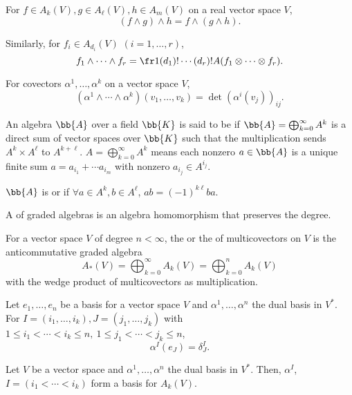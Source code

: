 For $f \in A_k(V), g \in A_\ell(V), h \in A_m(V)$ on a real vector space $V$,
\[
(f \wedge g) \wedge h = f \wedge ( g \wedge h).
\]

Similarly, for $f_i \in A_{d_i}(V)$ $(i = 1, \dotsc, r)$,
\[
f_1 \wedge \dotsb \wedge f_r = \fr1{(d_1)!\dotsm (d_r)!} A(f_1 \otimes \dotsm \otimes f_r).
\]

For covectors $\alpha^1, \dotsc , \alpha^k$ on a vector space $V$,
\[
(\alpha^1\wedge \dotsm \wedge \alpha^k)(v_1,\dotsc, v_k) = \det (\alpha^i (v_j))_{ij}.
\]

An algebra $\bb{A}$ over a field $\bb{K}$ is said to be  if $\bb{A} = \bigoplus_{k = 0}^\infty A^k$ is a direct sum of vector spaces over $\bb{K}$ such that the multiplication sends $A^k \times A^\ell$ to $A^{k+\ell}$. $A = \bigoplus_{k = 0}^\infty A^k$ means each nonzero $a \in \bb{A}$ is a unique finite sum $a = a_{i_1} + \dotsb a_{i_m}$ with nonzero $a_{i_j} \in A^{i_j}$.

$\bb{A}$ is  or  if $\forall a \in A^k, b \in A^\ell$, $ab = (-1)^{k\ell} ba$.

A  of graded algebras is an algebra homomorphism that preserves the degree.

For a vector space $V$ of degree $n < \infty$, the  or the  of multicovectors on $V$ is the anticommutative graded algebra
\[
A_* (V) = \bigoplus_{k = 0}^\infty A_k(V) = \bigoplus_{k = 0}^n A_k(V)
\]
with the wedge product of multicovectors as multiplication.

Let $e_1, \dotsc, e_n$ be a basis for a vector space $V$ and $\alpha^1, \dotsc, \alpha^n$ the dual basis in $V^*$. For $I = (i_1, \dotsc, i_k), J = (j_1, \dotsc, j_k)$ with $1 \le i_1 < \dotsb < i_k \le n,\ 1 \le j_1 < \dotsb < j_k \le n$,
\[
\alpha^I (e_J) = \delta^I_J.
\]

Let $V$ be a vector space and $\alpha^1,\dotsc,\alpha^n$ the dual basis in $V^*$. Then, $\alpha^I$, $I = (i_1 < \dotsb < i_k)$ form a basis for $A_k(V)$.

